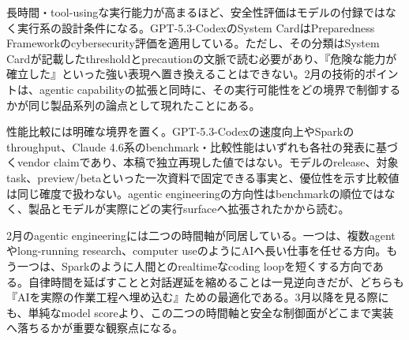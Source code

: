 \begin{claimboundary}
長時間・tool-usingな実行能力が高まるほど、安全性評価はモデルの付録ではなく実行系の設計条件になる。GPT-5.3-CodexのSystem CardはPreparedness Frameworkのcybersecurity評価を適用している。ただし、その分類はSystem Cardが記載したthresholdとprecautionの文脈で読む必要があり、『危険な能力が確立した』といった強い表現へ置き換えることはできない。2月の技術的ポイントは、agentic capabilityの拡張と同時に、その実行可能性をどの境界で制御するかが同じ製品系列の論点として現れたことにある。\autocite{src-15823ae5556e,src-4a841ea7ec7c,src-9aba7995b6a5,src-dd64fe3084a4}
\end{claimboundary}

\begin{claimboundary}
性能比較には明確な境界を置く。GPT-5.3-Codexの速度向上やSparkのthroughput、Claude 4.6系のbenchmark・比較性能はいずれも各社の発表に基づくvendor claimであり、本稿で独立再現した値ではない。モデルのrelease、対象task、preview/betaといった一次資料で固定できる事実と、優位性を示す比較値は同じ確度で扱わない。agentic engineeringの方向性はbenchmarkの順位ではなく、製品とモデルが実際にどの実行surfaceへ拡張されたかから読む。\autocite{src-15823ae5556e,src-4a841ea7ec7c,src-9aba7995b6a5,src-dd64fe3084a4,src-f6aa679babd7}
\end{claimboundary}

2月のagentic engineeringには二つの時間軸が同居している。一つは、複数agentやlong-running research、computer useのようにAIへ長い仕事を任せる方向。もう一つは、Sparkのように人間とのrealtimeなcoding loopを短くする方向である。自律時間を延ばすことと対話遅延を縮めることは一見逆向きだが、どちらも『AIを実際の作業工程へ埋め込む』ための最適化である。3月以降を見る際にも、単純なmodel scoreより、この二つの時間軸と安全な制御面がどこまで実装へ落ちるかが重要な観察点になる。\autocite{src-15823ae5556e,src-4a841ea7ec7c,src-9aba7995b6a5,src-dd64fe3084a4,src-f6aa679babd7}

